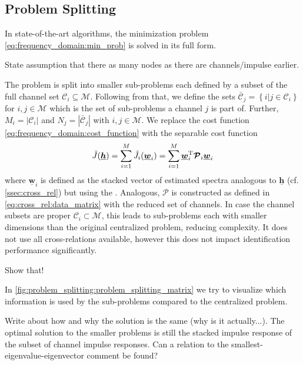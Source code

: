 \documentclass{article}
\newcommand{\hf}{\underline{\bm{h}}}
\newcommand{\wf}{\underline{\bm{w}}}
\newcommand{\aRhof}{\bm{\mathcal{P}}}
\newcommand{\Cset}{\mathcal{C}}
\newcommand{\Csetb}{\bar{\mathcal{C}}}
\newcommand{\Mset}{\mathcal{M}}
\begin{document}
\subsection{Problem Splitting}
\label{ssec:problem_splitting}
In state-of-the-art algorithms, the minimization problem \eqref{eq:frequency_domain:min_prob} is solved in its full form.
\begin{note}
    State assumption that there as many nodes as there are channels/impulse earlier.
\end{note}
The problem is split into smaller sub-problems each defined by a subset of the full channel set \(\Cset_i \subseteq \Mset\).
Following from that, we define the sets \(\Csetb_j = \left\{ i \vert j \in \Cset_i \right\}\) for \(i,j \in \Mset\) which is the set of sub-problems a channel  \(j\) is part of. 
Further, \(M_i = \left| \Cset_i \right| \) and \(N_j = \left| \Csetb_j \right| \) with \(i,j \in \Mset\).
We replace the cost function \eqref{eq:frequency_domain:cost_function} with the separable cost function 
\begin{equation}
    \tilde{J}(\hf) = \sum_{i=1}^M \tilde{J}_i(\wf_i)  = \sum_{i=1}^M \wf_i^\T \aRhof_i \wf_i
\end{equation}
where \(\wf_i\) is defined as the stacked vector of estimated spectra analogous to \(\hf\) (cf. \autoref{ssec:cross_rel}) but using the .
Analogous, \(\aRhof\) is constructed as defined in \eqref{eq:cross_rel:data_matrix} with the reduced set of channels.
In case the channel subsets are proper \(\Cset_i \subset \Mset\), this leads to sub-problems each with smaller dimensions than the original centralized problem, reducing complexity.
It does not use all cross-relations available, however this does not impact identification performance significantly. 
\begin{attention}
    Show that!
\end{attention}
In \autoref{fig:problem_splitting:problem_splitting_matrix} we try to visualize which information is used by the sub-problems compared to the centralized problem.
\begin{attention}
    Write about how and why the solution is the same (why is it actually...). The optimal solution to the smaller problems is still the stacked impulse response of the subset of channel impulse responses. Can a relation to the smallest-eigenvalue-eigenvector comment be found?
\end{attention}
\end{document}
